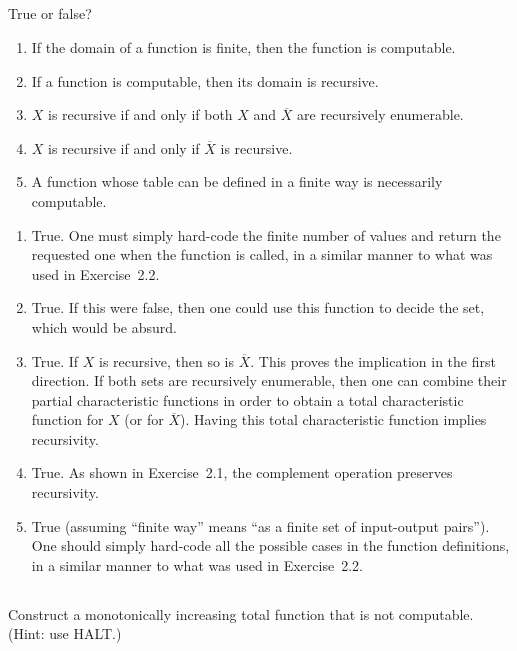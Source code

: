 \subsection{} %
True or false?
\begin{enumerate}
	\item If the domain of a function is finite,
	then the function is computable.
	\item If a function is computable, then its domain is recursive.
	\item \(X\) is recursive if and only if
	both \(X\) and \(\overline{X}\) are recursively enumerable.
	\item \(X\) is recursive if and only if \(\overline{X}\) is recursive.
	\item A function whose table can be defined in a finite way
	is necessarily computable.
\end{enumerate}

\begin{solution}
\begin{enumerate}
	\item True.
	One must simply hard-code the finite number of values
	and return the requested one when the function is called,
	in a similar manner to what was used in Exercise~2.2.
	\item True.
	If this were false, then one could use this function to decide the set,
	which would be absurd.
	\item True.
	If \(X\) is recursive, then so is \(\overline{X}\).
	This proves the implication in the first direction.
	If both sets are recursively enumerable,
	then one can combine their partial characteristic functions
	in order to obtain a total characteristic function for \(X\)
	(or for \(\overline{X}\)).
	Having this total characteristic function implies recursivity.
	\item True.
	As shown in Exercise~2.1,
	the complement operation preserves recursivity.
	\item True
	(assuming ``finite way'' means
	``as a finite set of input-output pairs'').
	One should simply hard-code all the possible cases
	in the function definitions,
	in a similar manner to what was used in Exercise~2.2.
\end{enumerate}
\end{solution}

\subsection{} %
Construct a monotonically increasing total function that is not computable.
(Hint: use HALT.)


